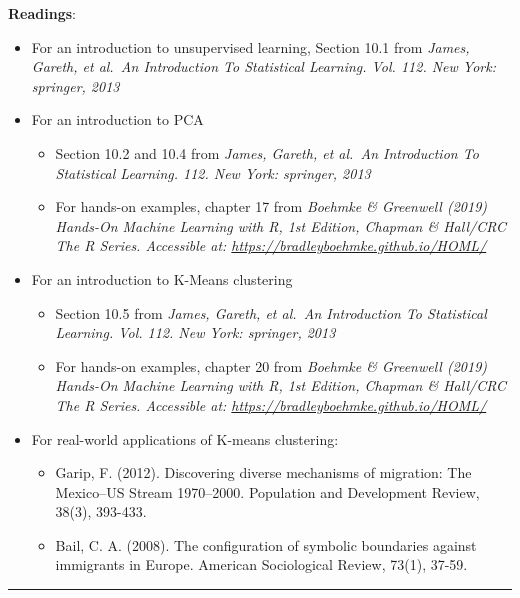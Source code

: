 \documentclass[
]{book}
\begin{document}
\textbf{Readings}:

\begin{itemize}
\item
  For an introduction to unsupervised learning, Section 10.1 from \emph{James, Gareth, et al.~An Introduction To Statistical Learning. Vol. 112. New York: springer, 2013}
\item
  For an introduction to PCA

  \begin{itemize}
  \item
    Section 10.2 and 10.4 from \emph{James, Gareth, et al.~An Introduction To Statistical Learning. 112. New York: springer, 2013}
  \item
    For hands-on examples, chapter 17 from \emph{Boehmke \& Greenwell (2019) Hands-On Machine Learning with R, 1st Edition, Chapman \& Hall/CRC The R Series. Accessible at: \url{https://bradleyboehmke.github.io/HOML/}}
  \end{itemize}
\item
  For an introduction to K-Means clustering

  \begin{itemize}
  \item
    Section 10.5 from \emph{James, Gareth, et al.~An Introduction To Statistical Learning. Vol. 112. New York: springer, 2013}
  \item
    For hands-on examples, chapter 20 from \emph{Boehmke \& Greenwell (2019) Hands-On Machine Learning with R, 1st Edition, Chapman \& Hall/CRC The R Series. Accessible at: \url{https://bradleyboehmke.github.io/HOML/}}
  \end{itemize}
\item
  For real-world applications of K-means clustering:

  \begin{itemize}
  \item
    Garip, F. (2012). Discovering diverse mechanisms of migration: The Mexico--US Stream 1970--2000. Population and Development Review, 38(3), 393-433.
  \item
    Bail, C. A. (2008). The configuration of symbolic boundaries against immigrants in Europe. American Sociological Review, 73(1), 37-59.
  \end{itemize}
\end{itemize}

\begin{center}\rule{0.5\linewidth}{\linethickness}\end{center}
\end{document}
